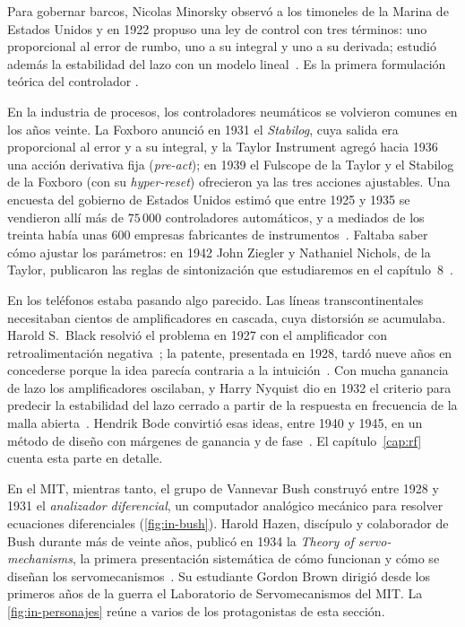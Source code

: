 Para gobernar barcos, Nicolas Minorsky observó a los timoneles de la Marina de Estados Unidos y en 1922 propuso una ley de control con tres términos: uno proporcional al error de rumbo, uno a su integral y uno a su derivada; estudió además la estabilidad del lazo con un modelo lineal~\citep{Min22,Ben84}. Es la primera formulación teórica del controlador .

En la industria de procesos, los controladores neumáticos se volvieron comunes en los años veinte. La Foxboro anunció en 1931 el \emph{Stabilog}, cuya salida era proporcional al error y a su integral, y la Taylor Instrument agregó hacia 1936 una acción derivativa fija (\emph{pre-act}); en 1939 el Fulscope de la Taylor y el Stabilog de la Foxboro (con su \emph{hyper-reset}) ofrecieron ya las tres acciones ajustables. Una encuesta del gobierno de Estados Unidos estimó que entre 1925 y 1935 se vendieron allí más de $75\,000$ controladores automáticos, y a mediados de los treinta había unas $600$ empresas fabricantes de instrumentos~\citep{BenPID93}. Faltaba saber cómo ajustar los parámetros: en 1942 John Ziegler y Nathaniel Nichols, de la Taylor, publicaron las reglas de sintonización que estudiaremos en el capítulo~8~\citep{ZiNi42}.

En los teléfonos estaba pasando algo parecido. Las líneas transcontinentales necesitaban cientos de amplificadores en cascada, cuya distorsión se acumulaba. Harold S.\ Black resolvió el problema en 1927 con el amplificador con retroalimentación negativa~\citep{black34}; la patente, presentada en 1928, tardó nueve años en concederse porque la idea parecía contraria a la intuición~\citep{blackpat,Bri11}. Con mucha ganancia de lazo los amplificadores oscilaban, y Harry Nyquist dio en 1932 el criterio para predecir la estabilidad del lazo cerrado a partir de la respuesta en frecuencia de la malla abierta~\citep{Nyq32,Bri10}. Hendrik Bode convirtió esas ideas, entre 1940 y 1945, en un método de diseño con márgenes de ganancia y de fase~\citep{Bod40,bode45}. El capítulo~\ref{cap:rf} cuenta esta parte en detalle.

En el MIT, mientras tanto, el grupo de Vannevar Bush construyó entre 1928 y 1931 el \emph{analizador diferencial}, un computador analógico mecánico para resolver ecuaciones diferenciales (\cref{fig:in-bush}). Harold Hazen, discípulo y colaborador de Bush durante más de veinte años, publicó en 1934 la \emph{Theory of servo-mechanisms}, la primera presentación sistemática de cómo funcionan y cómo se diseñan los servomecanismos~\citep{Haz34}. Su estudiante Gordon Brown dirigió desde los primeros años de la guerra el Laboratorio de Servomecanismos del MIT. La \cref{fig:in-personajes} reúne a varios de los protagonistas de esta sección.

